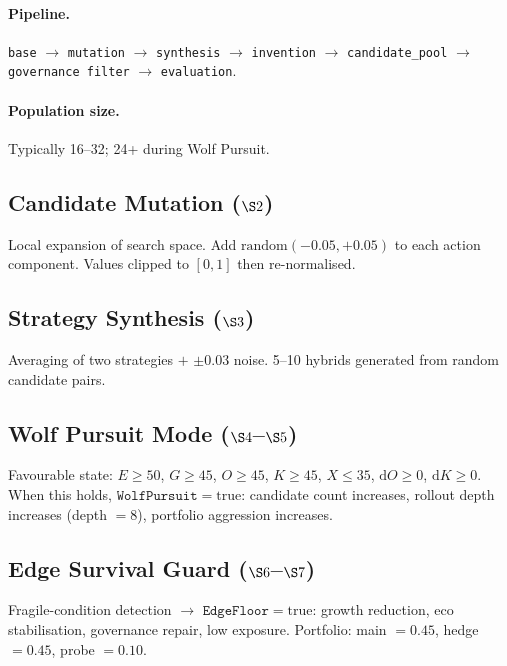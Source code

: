 \paragraph{Pipeline.}
\texttt{base} $\to$ \texttt{mutation} $\to$ \texttt{synthesis} $\to$
\texttt{invention} $\to$ \texttt{candidate\_pool} $\to$
\texttt{governance filter} $\to$ \texttt{evaluation}.

\paragraph{Population size.}
Typically 16--32; 24+ during Wolf Pursuit.

\subsection{Candidate Mutation ($\S 2$)}
\label{sec:omega-mutation}

Local expansion of search space. Add $\mathrm{random}(-0.05, +0.05)$
to each action component. Values clipped to $[0, 1]$ then
re-normalised.

\subsection{Strategy Synthesis ($\S 3$)}
\label{sec:omega-synthesis}

Averaging of two strategies $+$ $\pm 0.03$ noise. 5--10 hybrids
generated from random candidate pairs.

\subsection{Wolf Pursuit Mode ($\S 4$--$\S 5$)}
\label{sec:omega-wolf-pursuit}

Favourable state: $E \ge 50$, $G \ge 45$, $O \ge 45$, $K \ge 45$,
$X \le 35$, $\mathrm{d}O \ge 0$, $\mathrm{d}K \ge 0$. When this
holds, $\texttt{WolfPursuit} = \mathrm{true}$: candidate count
increases, rollout depth increases (depth $= 8$), portfolio
aggression increases.

\subsection{Edge Survival Guard ($\S 6$--$\S 7$)}
\label{sec:omega-edge-guard}

Fragile-condition detection $\to$ $\texttt{EdgeFloor} = \mathrm{true}$:
growth reduction, eco stabilisation, governance repair, low
exposure. Portfolio: main $= 0.45$, hedge $= 0.45$, probe $= 0.10$.

